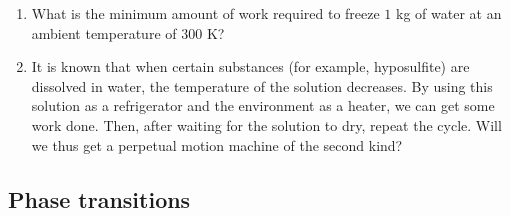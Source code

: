\documentclass{article}
\begin{document}
\begin{enumerate}[label=5.9.\arabic*]
\item What is the minimum amount of work required to freeze $1$ kg of water at an ambient temperature of $300$ K?

\item It is known that when certain substances (for example, hyposulfite) are dissolved in water, the temperature of the solution decreases. By using this solution as a refrigerator and the environment as a heater, we can get some work done. Then, after waiting for the solution to dry, repeat the cycle. Will we thus get a perpetual motion machine of the second kind?





\end{enumerate}

\subsection{Phase transitions}
\end{document}
